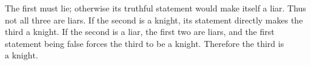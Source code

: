 The first must lie; otherwise its truthful statement would make itself a liar. Thus not all three are liars. If the second is a knight, its statement directly makes the third a knight. If the second is a liar, the first two are liars, and the first statement being false forces the third to be a knight. Therefore the third is $\boxed{\text{a knight}}$.
